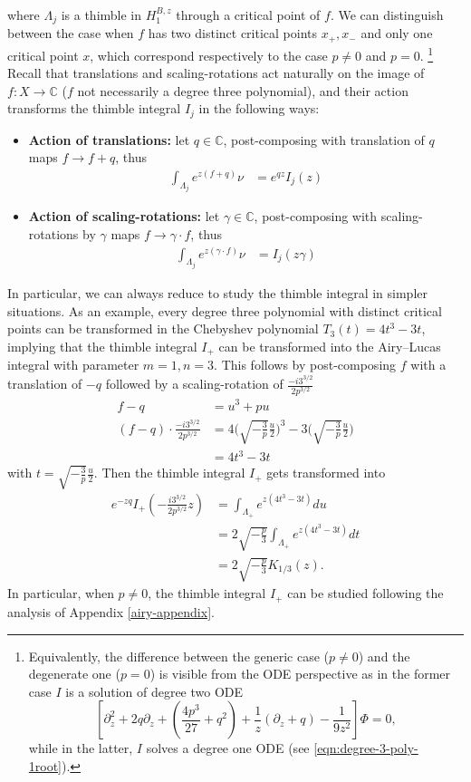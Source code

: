 \documentclass{article}
\theoremstyle{definition}
\newcommand{\C}{\mathbb{C}}
\begin{document}
where $\Lambda_j$ is a thimble in $H_{1}^{B,z}$ through a critical point of $f$. We can distinguish between the case when $f$ has two distinct critical points $x_+, x_-$ and only one critical point $x$, which correspond respectively to the case $p\neq 0$ and $p=0$. \footnote{Equivalently, the difference between the generic case ($p\neq 0$) and the degenerate one ($p=0$) is visible from the ODE perspective as in the former case $I$ is a solution of degree two ODE \[\left[\partial_z^2 +2q \partial_z+\left(\frac{4p^3}{27}+q^2\right)+\frac{1}{z}\left(\partial_z +q \right)-\frac{1}{9z^2}\right]\Phi=0,\] while in the latter, $I$ solves a degree one ODE (see \eqref{eqn:degree-3-poly-1root}).}
Recall that translations and scaling-rotations act naturally on the image of $f\colon X\to \C$ ($f$ not necessarily a degree three polynomial), and their action transforms the thimble integral $I_j$ in the following ways:
\begin{itemize}
    \item \textbf{Action of translations:} let $q\in\C$, post-composing with translation of $q$ maps $f\to f+q$, thus 
    \begin{align*}
        \int_{\Lambda_j}e^{z (f+q)} \nu &= e^{qz} I_j(z)
    \end{align*}
    \item  \textbf{Action of scaling-rotations:} let $\gamma\in\C$, post-composing with scaling-rotations by $\gamma$ maps $f\to \gamma\cdot f$, thus 
    \begin{align*}
        \int_{\Lambda_j}e^{z (\gamma\cdot f)} \nu &= I_j(z \gamma)
    \end{align*}
\end{itemize}
In particular, we can always reduce to study the thimble integral in simpler situations. 
As an example, every degree three polynomial with distinct critical points can be transformed in the Chebyshev polynomial $T_3(t)=4 t^3-3t$, implying that the thimble integral $I_+$ can be transformed into the Airy--Lucas integral with parameter $m=1, n=3$. This follows by post-composing $f$ with a translation of $-q$ followed by a scaling-rotation of $\frac{ -i 3^{3/2}}{2 p^{3/2}}$
\begin{align*}
    f-q &= u^3 + pu \\
    (f-q) \cdot \frac{ -i 3^{3/2}}{2 p^{3/2}} &= 4 \Big(\sqrt{-\tfrac{3}{p}} \tfrac{u}{2} \Big)^{3} - 3\Big(\sqrt{-\tfrac{3}{p}} \tfrac{u}{2} \Big) \\
    &= 4 t^3- 3t 
\end{align*}
with $t= \sqrt{-\frac{3}{p}} \frac{u}{2}$. Then the thimble integral $I_+$ gets transformed into 
\begin{align*}
    e^{-zq} I_+\left(-\tfrac{i 3^{3/2}}{2 p^{3/2}} z\right)&= \int_{\Lambda_+} e^{z (4t^3-3t)} du\\
    &= 2\sqrt{-\tfrac{p}{3}} \int_{\Lambda_+} e^{z (4t^3-3t)} dt \\
    &= 2\sqrt{-\tfrac{p}{3}} K_{1/3}(z). 
\end{align*}
In particular, when $p\neq 0$, the thimble integral $I_+$ can be studied following the analysis of Appendix \ref{airy-appendix}. 
\end{document}
